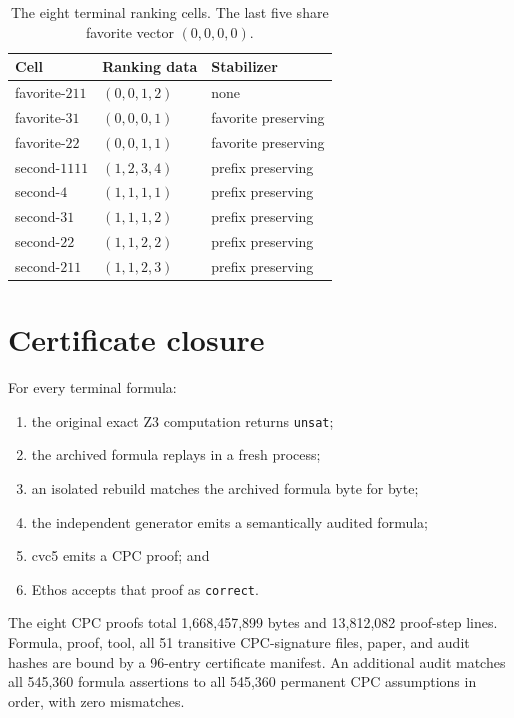 \documentclass[11pt]{article}
\theoremstyle{definition}
\begin{document}
\begin{table}[ht]
\centering
\small
\begin{tabular}{@{}lll@{}}
\toprule
Cell & Ranking data & Stabilizer\\
\midrule
favorite-$211$ & $(0,0,1,2)$ & none\\
favorite-$31$ & $(0,0,0,1)$ & favorite preserving\\
favorite-$22$ & $(0,0,1,1)$ & favorite preserving\\
second-$1111$ & $(1,2,3,4)$ & prefix preserving\\
second-$4$ & $(1,1,1,1)$ & prefix preserving\\
second-$31$ & $(1,1,1,2)$ & prefix preserving\\
second-$22$ & $(1,1,2,2)$ & prefix preserving\\
second-$211$ & $(1,1,2,3)$ & prefix preserving\\
\bottomrule
\end{tabular}
\caption{The eight terminal ranking cells. The last five share favorite
vector $(0,0,0,0)$.}
\label{tab:cells}
\end{table}

\section{Certificate closure}

For every terminal formula:
\begin{enumerate}[leftmargin=2.1em]
  \item the original exact Z3 computation returns \texttt{unsat};
  \item the archived formula replays in a fresh process;
  \item an isolated rebuild matches the archived formula byte for byte;
  \item the independent generator emits a semantically audited formula;
  \item cvc5 emits a CPC proof; and
  \item Ethos accepts that proof as \texttt{correct}.
\end{enumerate}

The eight CPC proofs total 1,668,457,899 bytes and 13,812,082 proof-step
lines. Formula, proof, tool, all 51 transitive CPC-signature files, paper, and
audit hashes are bound by a 96-entry certificate manifest. An additional
audit matches all 545,360 formula assertions to all 545,360 permanent CPC
assumptions in order, with zero mismatches.
\end{document}
